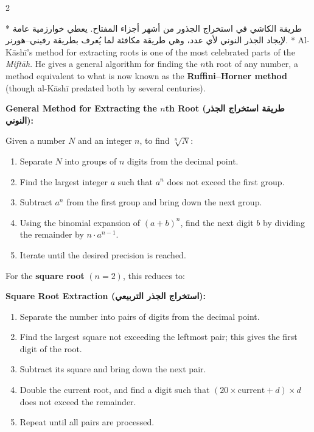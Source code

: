 \documentclass[11pt,a4paper]{article}
\newcommand{\ar}[1]{{\arabicfont\beginR #1\endR}}
\newenvironment{bilingual}{%
  \vspace{0.3em}%
  \begin{paracol}{2}%
}{%
  \end{paracol}%
  \vspace{0.3em}%
}
\newenvironment{mathalgo}{%
  \par\vspace{0.3cm}
  \begin{framed}
  \setlength{\parindent}{0pt}
}{%
  \end{framed}
  \par\vspace{0.3cm}
}
\begin{document}
\begin{bilingual}
\switchcolumn[0]*
\ar{طريقة الكاشي في استخراج الجذور من أشهر أجزاء المفتاح. يعطي خوارزمية عامة لإيجاد الجذر النوني لأي عدد، وهي طريقة مكافئة لما يُعرف بطريقة رفيني--هورنر.}
\switchcolumn[1]*
Al-K\=ash\=i's method for extracting roots is one of the most celebrated
parts of the \textit{Mift\=ah}. He gives a general algorithm for finding
the $n$th root of any number, a method equivalent to what is now known
as the \textbf{Ruffini--Horner method} (though al-K\=ash\=i predated both by
several centuries).
\end{bilingual}

\begin{mathalgo}
\textbf{General Method for Extracting the $n$th Root (\ar{طريقة استخراج الجذر النوني}):}

Given a number $N$ and an integer $n$, to find $\sqrt[n]{N}$:
\begin{enumerate}[nosep]
  \item Separate $N$ into groups of $n$ digits from the decimal point.
  \item Find the largest integer $a$ such that $a^n$ does not exceed the
  first group.
  \item Subtract $a^n$ from the first group and bring down the next
  group.
  \item Using the binomial expansion of $(a + b)^n$, find the next digit
  $b$ by dividing the remainder by $n \cdot a^{n-1}$.
  \item Iterate until the desired precision is reached.
\end{enumerate}
\end{mathalgo}

\noindent For the \textbf{square root} $(n=2)$, this reduces to:

\begin{mathalgo}
\textbf{Square Root Extraction (\ar{استخراج الجذر التربيعي}):}
\begin{enumerate}[nosep]
  \item Separate the number into pairs of digits from the decimal point.
  \item Find the largest square not exceeding the leftmost pair; this
  gives the first digit of the root.
  \item Subtract its square and bring down the next pair.
  \item Double the current root, and find a digit such that
  $(20 \times \text{current} + d) \times d$ does not exceed the remainder.
  \item Repeat until all pairs are processed.
\end{enumerate}
\end{mathalgo}
\end{document}
